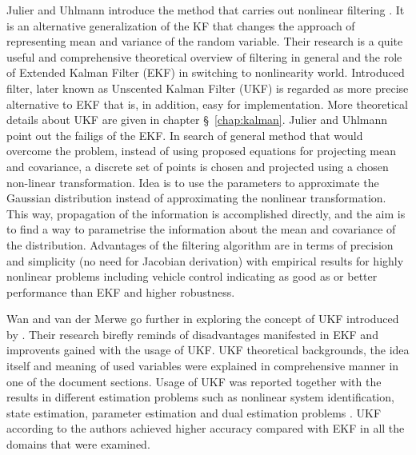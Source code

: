 Julier and Uhlmann introduce the method that carries out nonlinear filtering \cite{julier96}. It is an alternative generalization of the KF that changes the approach of representing mean and variance of the random variable. Their research is a quite useful and comprehensive theoretical overview of filtering in general and the role of Extended Kalman Filter (EKF) in switching to nonlinearity world. Introduced filter, later known as Unscented Kalman Filter (UKF) is regarded as more precise alternative to EKF that is, in addition, easy for implementation. More theoretical details about UKF are given in chapter \S~\ref{chap:kalman}.    Julier and Uhlmann point out the failigs of the EKF. In search of general method that would overcome the problem, instead of using proposed equations for projecting mean and covariance, a discrete set of points is chosen and projected using a chosen non-linear transformation. Idea is to use the parameters to approximate the Gaussian distribution instead of approximating the nonlinear transformation. This way, propagation of the information is accomplished directly, and the aim is to find a way to parametrise the information about the mean and covariance of the distribution. Advantages of the filtering algorithm are in terms of precision and simplicity (no need for Jacobian derivation) with empirical results for highly nonlinear problems including vehicle control indicating as good as or better performance than EKF and higher robustness.

Wan and van der Merwe \cite{wan00} go further in exploring the concept of UKF introduced by \cite{julier96}. Their research birefly reminds of disadvantages manifested in EKF and improvents gained with the usage of UKF. UKF theoretical backgrounds, the idea itself and meaning of used variables were explained in comprehensive manner in one of the document sections. Usage of UKF was reported together with the results in different estimation problems such as nonlinear system identification, state estimation, parameter estimation and dual estimation problems \cite{wan00}. UKF according to the authors achieved higher accuracy compared with EKF in all the domains that were examined.

